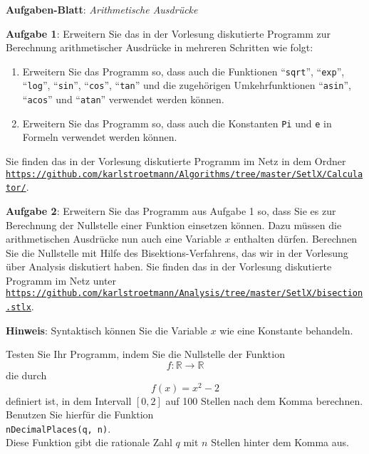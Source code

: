 \documentclass{article}
\begin{document}
\noindent
{\Large \textbf{Aufgaben-Blatt}: \emph{Arithmetische Ausdr\"ucke}}

\vspace{0.5cm}


\noindent
\textbf{Aufgabe 1}: 
Erweitern Sie das in der Vorlesung diskutierte Programm zur Berechnung arithmetischer Ausdr\"ucke in mehreren 
Schritten wie folgt:
\begin{enumerate}
\item Erweitern Sie das Programm so, dass auch die
      Funktionen ``\texttt{sqrt}'', ``\texttt{exp}'', ``\texttt{log}'', ``\texttt{sin}'',
      ``\texttt{cos}'', ``\texttt{tan}'' und die zugeh\"origen Umkehrfunktionen 
      ``\texttt{asin}'', ``\texttt{acos}'' und ``\texttt{atan}''
      verwendet werden k\"onnen.
\item Erweitern Sie das Programm so, dass auch die Konstanten \texttt{Pi} und
      \texttt{e} in Formeln verwendet werden k\"onnen.
\end{enumerate}
Sie finden das in der Vorlesung diskutierte Programm im Netz in dem Ordner
\\[0.2cm]
\hspace*{0.3cm} 
\href{https://github.com/karlstroetmann/Algorithms/tree/master/SetlX/Calculator}{\texttt{https://github.com/karlstroetmann/Algorithms/tree/master/SetlX/Calculator/}}.
\vspace{0.5cm}

\noindent
\textbf{Aufgabe 2}: 
Erweitern Sie das Programm aus Aufgabe 1 so, dass Sie es zur Berechnung der Nullstelle
einer Funktion einsetzen k\"onnen.  Dazu m\"ussen die arithmetischen
Ausdr\"ucke nun auch eine Variable $x$ enthalten d\"urfen.  
Berechnen Sie die Nullstelle mit Hilfe des Bisektions-Verfahrens, das wir in der Vorlesung \"uber
Analysis diskutiert haben.
Sie finden das in der Vorlesung diskutierte Programm im Netz unter
\\[0.2cm]
\hspace*{0.3cm} 
\href{https://github.com/karlstroetmann/Analysis/tree/master/SetlX/bisection.stlx}{\texttt{https://github.com/karlstroetmann/Analysis/tree/master/SetlX/bisection.stlx}}.
\vspace{0.5cm}


\noindent
\textbf{Hinweis}: Syntaktisch k\"onnen Sie die Variable $x$ wie eine Konstante behandeln.
\vspace{0.5cm}

\noindent
Testen Sie Ihr Programm, indem Sie die Nullstelle der Funktion 
\[ f: \mathbb{R} \rightarrow \mathbb{R} \]
die durch 
\[ f(x) = x^2 - 2 \]
definiert ist, in dem Intervall $[0,2]$ auf 100 Stellen nach dem Komma berechnen.  Benutzen Sie
hierf\"ur die Funktion
\\[0.2cm]
\hspace*{1.3cm}
\texttt{nDecimalPlaces(q, n)}.
\\[0.2cm]
Diese Funktion gibt die rationale Zahl $q$ mit $n$ Stellen hinter dem Komma aus.
\end{document}
